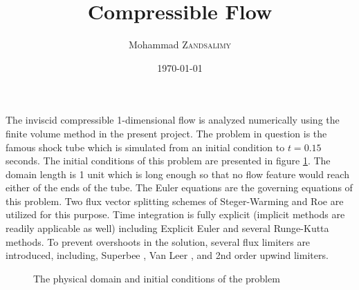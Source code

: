 \documentclass{article}
\title{Compressible Flow}
\author{Mohammad \textsc{Zandsalimy}}
\date{\today}
\begin{document}
\maketitle


The inviscid compressible 1-dimensional flow is analyzed numerically using the finite volume method in the present project. The problem in question is the famous shock tube which is simulated from an initial condition to $t=0.15$ seconds. The initial conditions of this problem are presented in figure \ref{fig_initial_condition_1}. The domain length is 1 unit which is long enough so that no flow feature would reach either of the ends of the tube. The Euler equations are the governing equations of this problem. Two flux vector splitting schemes of Steger-Warming \cite{steger1981flux} and Roe \cite{van1987comparison} are utilized for this purpose. Time integration is fully explicit (implicit methods are readily applicable as well) including Explicit Euler and several Runge-Kutta methods. To prevent overshoots in the solution, several flux limiters are introduced, including, Superbee \cite{arora1997well}, Van Leer \cite{sweby1984high}, and 2nd order upwind limiters.

\begin{figure}[ht]
  \centering
  \caption{The physical domain and initial conditions of the problem}
  \label{fig_initial_condition_1}
\end{figure}
\end{document}
